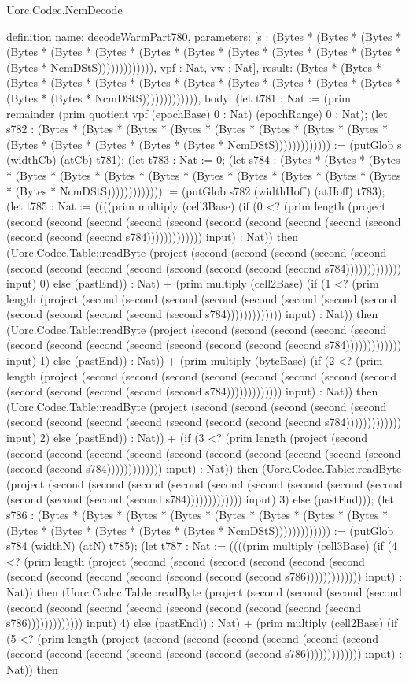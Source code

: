 \begin{lexlean}{Uorc.Codec.NcmDecode}
\begin{semanticmodule}
definition{
  name: decodeWarmPart780,
  parameters: [s : (Bytes * (Bytes * (Bytes * (Bytes * (Bytes * (Bytes * (Bytes * (Bytes * (Bytes * (Bytes * (Bytes * (Bytes * (Bytes * NcmDStS))))))))))))), vpf : Nat, vw : Nat],
  result: (Bytes * (Bytes * (Bytes * (Bytes * (Bytes * (Bytes * (Bytes * (Bytes * (Bytes * (Bytes * (Bytes * (Bytes * (Bytes * NcmDStS))))))))))))),
  body: (let t781 : Nat := (prim remainder (prim quotient vpf (epochBase) 0 : Nat) (epochRange) 0 : Nat); (let s782 : (Bytes * (Bytes * (Bytes * (Bytes * (Bytes * (Bytes * (Bytes * (Bytes * (Bytes * (Bytes * (Bytes * (Bytes * (Bytes * NcmDStS))))))))))))) := (putGlob s (widthCb) (atCb) t781); (let t783 : Nat := 0; (let s784 : (Bytes * (Bytes * (Bytes * (Bytes * (Bytes * (Bytes * (Bytes * (Bytes * (Bytes * (Bytes * (Bytes * (Bytes * (Bytes * NcmDStS))))))))))))) := (putGlob s782 (widthHoff) (atHoff) t783); (let t785 : Nat := ((((prim multiply (cell3Base) (if (0 <? (prim length (project (second (second (second (second (second (second (second (second (second (second (second (second (second s784))))))))))))) input) : Nat)) then (Uorc.Codec.Table::readByte (project (second (second (second (second (second (second (second (second (second (second (second (second (second s784))))))))))))) input) 0) else (pastEnd)) : Nat) + (prim multiply (cell2Base) (if (1 <? (prim length (project (second (second (second (second (second (second (second (second (second (second (second (second (second s784))))))))))))) input) : Nat)) then (Uorc.Codec.Table::readByte (project (second (second (second (second (second (second (second (second (second (second (second (second (second s784))))))))))))) input) 1) else (pastEnd)) : Nat)) + (prim multiply (byteBase) (if (2 <? (prim length (project (second (second (second (second (second (second (second (second (second (second (second (second (second s784))))))))))))) input) : Nat)) then (Uorc.Codec.Table::readByte (project (second (second (second (second (second (second (second (second (second (second (second (second (second s784))))))))))))) input) 2) else (pastEnd)) : Nat)) + (if (3 <? (prim length (project (second (second (second (second (second (second (second (second (second (second (second (second (second s784))))))))))))) input) : Nat)) then (Uorc.Codec.Table::readByte (project (second (second (second (second (second (second (second (second (second (second (second (second (second s784))))))))))))) input) 3) else (pastEnd))); (let s786 : (Bytes * (Bytes * (Bytes * (Bytes * (Bytes * (Bytes * (Bytes * (Bytes * (Bytes * (Bytes * (Bytes * (Bytes * (Bytes * NcmDStS))))))))))))) := (putGlob s784 (widthN) (atN) t785); (let t787 : Nat := ((((prim multiply (cell3Base) (if (4 <? (prim length (project (second (second (second (second (second (second (second (second (second (second (second (second (second s786))))))))))))) input) : Nat)) then (Uorc.Codec.Table::readByte (project (second (second (second (second (second (second (second (second (second (second (second (second (second s786))))))))))))) input) 4) else (pastEnd)) : Nat) + (prim multiply (cell2Base) (if (5 <? (prim length (project (second (second (second (second (second (second (second (second (second (second (second (second (second s786))))))))))))) input) : Nat)) then }
\end{semanticmodule}
\end{lexlean}
